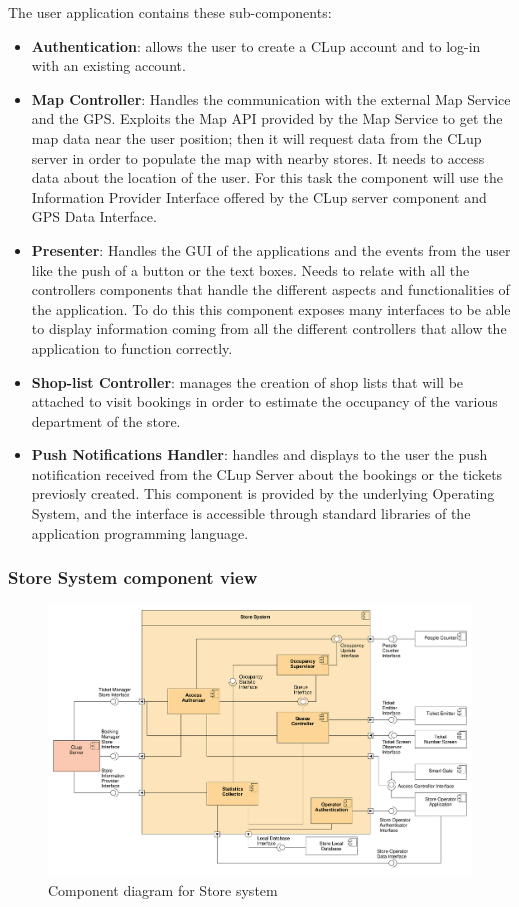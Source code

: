 The user application contains these sub-components:
\begin{itemize}
    \item \textbf{Authentication}: allows the user to create a CLup account and to log-in with an existing account.
    \item \textbf{Map Controller}: Handles the communication with the external Map Service and the GPS. Exploits the Map API provided by the Map Service to get the map data near the user position; then it will request data from the CLup server in order to populate the map with nearby stores. It needs to access data about the location of the user. For this task the component will use the Information Provider Interface offered by the CLup server component and GPS Data Interface.
    \item \textbf{Presenter}: Handles the GUI of the applications and the events from the user like the push of a button or the text boxes. Needs to relate with all the controllers components that handle the different aspects and functionalities of the application. To do this this component exposes many interfaces to be able to display information coming from all the different controllers that allow the application to function correctly.
    \item \textbf{Shop-list Controller}: manages the creation of shop lists that will be attached to visit bookings in order to estimate the occupancy of the various department of the store.
    \item \textbf{Push Notifications Handler}: handles and displays to the user the push notification received from the CLup Server about the bookings or the tickets previosly created. This component is provided by the underlying Operating System, and the interface is accessible through standard libraries of the application programming language.
\end{itemize}

\clearpage

\subsubsection{Store System component view}
\begin{figure}[H]
    \includegraphics[width=\textwidth]{Images/UML_store_system_component.pdf}
    \caption{\label{fig:UML_comp_CLup_store_system}Component diagram for Store system}
\end{figure}


